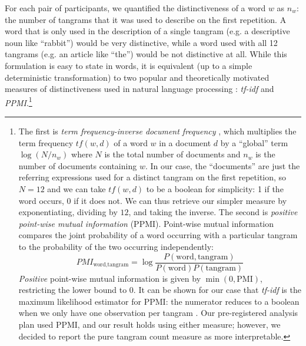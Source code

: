 \documentclass[alpha-refs]{wiley-article}
\begin{document}
For each pair of participants, we quantified the distinctiveness of a word $w$ as $n_w$: the number of tangrams that it was used to describe on the first repetition.
A word that is only used in the description of a single tangram (e.g. a descriptive noun like ``rabbit'') would be very distinctive, while a word used with all 12 tangrams (e.g. an article like ``the'') would be not distinctive at all.
While this formulation is easy to state in words, it is equivalent (up to a simple deterministic transformation) to two popular and theoretically motivated measures of distinctiveness used in natural language processing \citep{salton1988term}: \emph{tf-idf} and \emph{PPMI}.\footnote{
The first is \emph{term frequency-inverse document frequency} \citep[tf-idf,][]{sparck1972statistical}, which multiplies the term frequency $tf(w,d)$ of a word $w$ in a document $d$ by a ``global'' term $\log(N/n_w)$ where $N$ is the total number of documents and $n_w$ is the number of documents containing $w$.
In our case, the ``documents'' are just the referring expressions used for a distinct tangram on the first repetition, so $N=12$ and we can take $tf(w,d)$ to be a boolean for simplicity: 1 if the word occurs, 0 if it does not.
We can thus retrieve our simpler measure by exponentiating, dividing by $12$, and taking the inverse.
The second is \emph{positive point-wise mutual information} (PPMI).
Point-wise mutual information compares the joint probability of a word occurring with a particular tangram to the probability of the two occurring independently:
$$PMI_{\textrm{word},\textrm{tangram}} = \log\frac{P(\textrm{word}, \textrm{tangram})}{P(\textrm{word})P(\textrm{tangram})}$$
\emph{Positive} point-wise mutual information is given by $\min(0, \textrm{PMI})$, restricting the lower bound to 0.
It can be shown for our case that \emph{tf-idf} is the maximum likelihood estimator for PPMI: the numerator reduces to a boolean when we only have one observation per tangram \citep{robertson2004understanding}. Our pre-registered analysis plan used PPMI, and our result holds using either measure; however, we decided to report the pure tangram count measure as more interpretable.}
%
\end{document}
